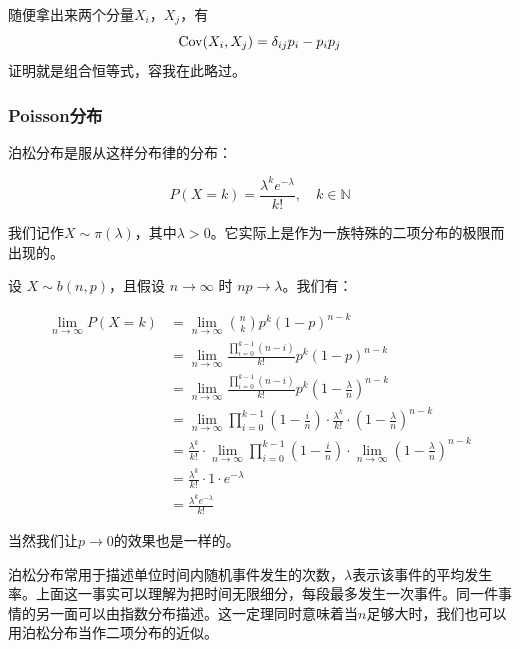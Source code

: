 随便拿出来两个分量$X_i$，$X_j$，有
\[
\operatorname{Cov}(X_i,X_j)=\delta_{ij}p_i - p_ip_j
\]
证明就是组合恒等式，容我在此略过。

\subsubsection{Poisson分布}

泊松分布是服从这样分布律的分布：

\[
P(X=k) = \frac{\lambda^ke^{-\lambda}}{k!},\quad k\in \mathbb{N}
\]

我们记作$X\sim \pi(\lambda)$，其中$\lambda > 0$。它实际上是作为一族特殊的二项分布的极限而出现的。

设 $X\sim b\left(n,p\right)$，且假设 $n \to \infty$ 时 $np \to \lambda$。我们有：

\begin{align*}
\lim_{n\to \infty}P(X=k) &= \lim_{n\to \infty} \binom{n}{k} p^k (1-p)^{n-k}\\
&= \lim_{n\to \infty} \frac{\prod_{i=0}^{k-1}(n-i)}{k!} p^k (1-p)^{n-k}\\
&= \lim_{n\to \infty} \frac{\prod_{i=0}^{k-1}(n-i)}{k!} p^k \left(1-\frac{\lambda}{n}\right)^{n-k}\\
&= \lim_{n\to \infty} \prod_{i=0}^{k-1}\left(1-\frac in\right) \cdot \frac{\lambda^k}{k!} \cdot \left(1-\frac{\lambda}{n}\right)^{n-k}\\
&= \frac{\lambda^k}{k!} \cdot \lim_{n\to \infty} \prod_{i=0}^{k-1}\left(1-\frac in\right) \cdot \lim_{n\to \infty} \left(1-\frac{\lambda}{n}\right)^{n-k}\\
&= \frac{\lambda^k}{k!} \cdot 1 \cdot e^{-\lambda}\\
&= \frac{\lambda^k e^{-\lambda}}{k!}
\end{align*}

当然我们让$p\to0$的效果也是一样的。

泊松分布常用于描述单位时间内随机事件发生的次数，$\lambda$表示该事件的平均发生率。上面这一事实可以理解为把时间无限细分，每段最多发生一次事件。同一件事情的另一面可以由指数分布描述。这一定理同时意味着当$n$足够大时，我们也可以用泊松分布当作二项分布的近似。

